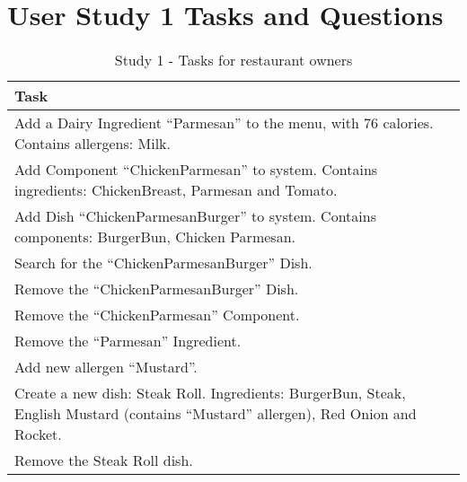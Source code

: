 \chapter{User Study 1 Tasks and Questions}
\label{app:study1}


\begin{table}[h]
    \centering
    \begin{tabular}{ |p{\textwidth}| }
    \hline
    \textbf{Task}\\
    \hline
    Add a Dairy Ingredient ``Parmesan'' to the menu, with 76 calories. Contains allergens: Milk. \\
    \hline
    Add Component ``ChickenParmesan'' to system. Contains ingredients: ChickenBreast, Parmesan and Tomato. \\
    \hline
    Add Dish ``ChickenParmesanBurger'' to system. Contains components: BurgerBun, Chicken Parmesan. \\
    \hline
    Search for the ``ChickenParmesanBurger'' Dish. \\
    \hline
    Remove the ``ChickenParmesanBurger'' Dish. \\
    \hline
    Remove the ``ChickenParmesan'' Component. \\
    \hline
    Remove the ``Parmesan'' Ingredient. \\
    \hline
    Add new allergen ``Mustard''. \\
    \hline
    Create a new dish: Steak Roll. Ingredients: BurgerBun, Steak, English Mustard (contains ``Mustard'' allergen), Red Onion and Rocket. \\
    \hline
    Remove the Steak Roll dish. \\
    \hline
    \end{tabular}
    \caption{Study 1 - Tasks for restaurant owners}
    \label{tab:Study1TasksRO}
\end{table}


